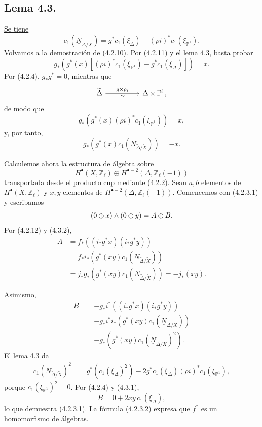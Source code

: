 \subsection*{Lema 4.3.}
\underline{Se tiene}
\[
c_1(\underline N_{\widetilde\Delta/\widetilde X})
=g^*c_1(\xi_\Delta)-(\rho i)^*c_1(\xi_{\mathbb P^1}).
\]
Volvamos a la demostración de (4.2.10). Por (4.2.11) y el lema 4.3,
basta probar
\[
g_*\!\left(g^*(x)\left[(\rho i)^*c_1(\xi_{\mathbb P^1})
                       -g^*c_1(\xi_\Delta)\right]\right)=x.
\]
Por (4.2.4), $g_*g^*=0$, mientras que
\[
\begin{tikzcd}[column sep=huge]
\widetilde\Delta\arrow[r,"g\times\rho_i","\sim"']
  &\Delta\times\mathbb P^1,
\end{tikzcd}
\]
de modo que
\begin{equation}\tag{4.3.1}
g_*\!\left(g^*(x)(\rho i)^*c_1(\xi_{\mathbb P^1})\right)=x,
\end{equation}
y, por tanto,
\begin{equation}\tag{4.3.2}
g_*\!\left(g^*(x)c_1(\underline N_{\widetilde\Delta/\widetilde X})\right)
=-x.
\end{equation}

Calculemos ahora la estructura de álgebra sobre
\[
H^\bullet(X,\mathbb Z_\ell)\oplus
H^{\bullet-2}(\Delta,\mathbb Z_\ell(-1))
\]
transportada desde el producto cup mediante (4.2.2). Sean $a,b$
elementos de $H^\bullet(X,\mathbb Z_\ell)$ y $x,y$ elementos de
$H^{\bullet-2}(\Delta,\mathbb Z_\ell(-1))$. Comencemos con (4.2.3.1)
y escribamos
\[
(0\oplus x)\wedge(0\oplus y)=A\oplus B.
\]
Por (4.2.12) y (4.3.2),
\[
\begin{aligned}
A
&=f_*\!\left((i_*g^*x)(i_*g^*y)\right)\\
&=f_*i_*\!\left(g^*(xy)c_1(\underline N_{\widetilde\Delta/\widetilde X})\right)\\
&=j_*g_*\!\left(g^*(xy)c_1(\underline N_{\widetilde\Delta/\widetilde X})\right)
=-j_*(xy).
\end{aligned}
\]

\pageoriginale

Asimismo,
\[
\begin{aligned}
B
&=-g_*i^*\!\left((i_*g^*x)(i_*g^*y)\right)\\
&=-g_*i^*i_*\!\left(g^*(xy)c_1(\underline N_{\widetilde\Delta/\widetilde X})\right)\\
&=-g_*\!\left(g^*(xy)c_1(\underline N_{\widetilde\Delta/\widetilde X})^2\right).
\end{aligned}
\]
El lema 4.3 da
\[
\begin{aligned}
c_1(\underline N_{\widetilde\Delta/\widetilde X})^2
&=g^*\!\left(c_1(\xi_\Delta)^2\right)
 -2g^*c_1(\xi_\Delta)(\rho i)^*c_1(\xi_{\mathbb P^1}),
\end{aligned}
\]
porque $c_1(\xi_{\mathbb P^1})^2=0$. Por (4.2.4) y (4.3.1),
\[
B=0+2xy\,c_1(\xi_\Delta),
\]
lo que demuestra (4.2.3.1). La fórmula (4.2.3.2) expresa que $f^*$ es
un homomorfismo de álgebras.

